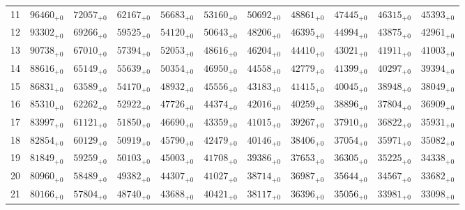 \documentclass[10pt, a4paper]{article}
\begin{document}
\begin{center}
\begin{tabular}{c || c c c c c | c c c c c}
        \hline
        11 & \({96460}_{+0}\) & \({72057}_{+0}\) & \({62167}_{+0}\) & \({56683}_{+0}\) & \({53160}_{+0}\) & \({50692}_{+0}\) & \({48861}_{+0}\) & \({47445}_{+0}\) & \({46315}_{+0}\) & \({45393}_{+0}\)\\
        12 & \({93302}_{+0}\) & \({69266}_{+0}\) & \({59525}_{+0}\) & \({54120}_{+0}\) & \({50643}_{+0}\) & \({48206}_{+0}\) & \({46395}_{+0}\) & \({44994}_{+0}\) & \({43875}_{+0}\) & \({42961}_{+0}\)\\
        13 & \({90738}_{+0}\) & \({67010}_{+0}\) & \({57394}_{+0}\) & \({52053}_{+0}\) & \({48616}_{+0}\) & \({46204}_{+0}\) & \({44410}_{+0}\) & \({43021}_{+0}\) & \({41911}_{+0}\) & \({41003}_{+0}\)\\
        14 & \({88616}_{+0}\) & \({65149}_{+0}\) & \({55639}_{+0}\) & \({50354}_{+0}\) & \({46950}_{+0}\) & \({44558}_{+0}\) & \({42779}_{+0}\) & \({41399}_{+0}\) & \({40297}_{+0}\) & \({39394}_{+0}\)\\
        15 & \({86831}_{+0}\) & \({63589}_{+0}\) & \({54170}_{+0}\) & \({48932}_{+0}\) & \({45556}_{+0}\) & \({43183}_{+0}\) & \({41415}_{+0}\) & \({40045}_{+0}\) & \({38948}_{+0}\) & \({38049}_{+0}\)\\
        \hline
        16 & \({85310}_{+0}\) & \({62262}_{+0}\) & \({52922}_{+0}\) & \({47726}_{+0}\) & \({44374}_{+0}\) & \({42016}_{+0}\) & \({40259}_{+0}\) & \({38896}_{+0}\) & \({37804}_{+0}\) & \({36909}_{+0}\)\\
        17 & \({83997}_{+0}\) & \({61121}_{+0}\) & \({51850}_{+0}\) & \({46690}_{+0}\) & \({43359}_{+0}\) & \({41015}_{+0}\) & \({39267}_{+0}\) & \({37910}_{+0}\) & \({36822}_{+0}\) & \({35931}_{+0}\)\\
        18 & \({82854}_{+0}\) & \({60129}_{+0}\) & \({50919}_{+0}\) & \({45790}_{+0}\) & \({42479}_{+0}\) & \({40146}_{+0}\) & \({38406}_{+0}\) & \({37054}_{+0}\) & \({35971}_{+0}\) & \({35082}_{+0}\)\\
        19 & \({81849}_{+0}\) & \({59259}_{+0}\) & \({50103}_{+0}\) & \({45003}_{+0}\) & \({41708}_{+0}\) & \({39386}_{+0}\) & \({37653}_{+0}\) & \({36305}_{+0}\) & \({35225}_{+0}\) & \({34338}_{+0}\)\\
        20 & \({80960}_{+0}\) & \({58489}_{+0}\) & \({49382}_{+0}\) & \({44307}_{+0}\) & \({41027}_{+0}\) & \({38714}_{+0}\) & \({36987}_{+0}\) & \({35644}_{+0}\) & \({34567}_{+0}\) & \({33682}_{+0}\)\\
        \hline
        21 & \({80166}_{+0}\) & \({57804}_{+0}\) & \({48740}_{+0}\) & \({43688}_{+0}\) & \({40421}_{+0}\) & \({38117}_{+0}\) & \({36396}_{+0}\) & \({35056}_{+0}\) & \({33981}_{+0}\) & \({33098}_{+0}\)\\

\end{tabular}
\end{center}
\end{document}
